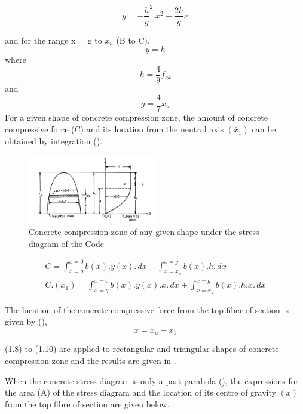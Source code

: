 \begin{equation}
y=-\frac{h}{g}^2.x^2+\frac{2h}{g} x
\end{equation}

and for the range x = g to $x_{u}$ (B to C),
\begin{equation}
y=h
\end{equation}
where
$$h=\frac{4}{9}f_{ck}$$
and
$$g=\frac{4}{7}x_u$$
For a given shape of concrete compression zone, the amount of concrete
compressive force (C) and its location from the neutral axis ${(\bar x_1)}$
can be obtained by integration ().

\begin{figure}
\centering
\includegraphics[width=0.5\textwidth]{images/concrete.png}
\caption{Concrete compression zone of any given shape under the stress diagram of the Code}
\label{fig:concrete}
\end{figure}

\begin{align}
C=\int_{x=g}^{x=0}b(x).y(x).\,dx+\int_{{x=x_u}}^{x=g}b(x).h.\,dx\\
C.(\bar x_1)=\int_{x=g}^{x=0}b(x).y(x).x.\,dx+\int_{{x=x_u}}^{x=g}b(x).h.x.\,dx
\end{align}

The location of the concrete compressive force from the top fiber of 
section is given by (),
\begin{equation}
\bar x=x_u-\bar x_1
\end{equation}

\eqn (1.8) to \eqn (1.10) are applied to rectangular and triangular
shapes of concrete compression zone and the results are given in .

When the concrete stress diagram is only a part-parabola (), 
the expressions for the area (A) of the stress diagram and the location
of its centre of gravity ${(\bar x)}$ from the top fibre of section are
given below.

